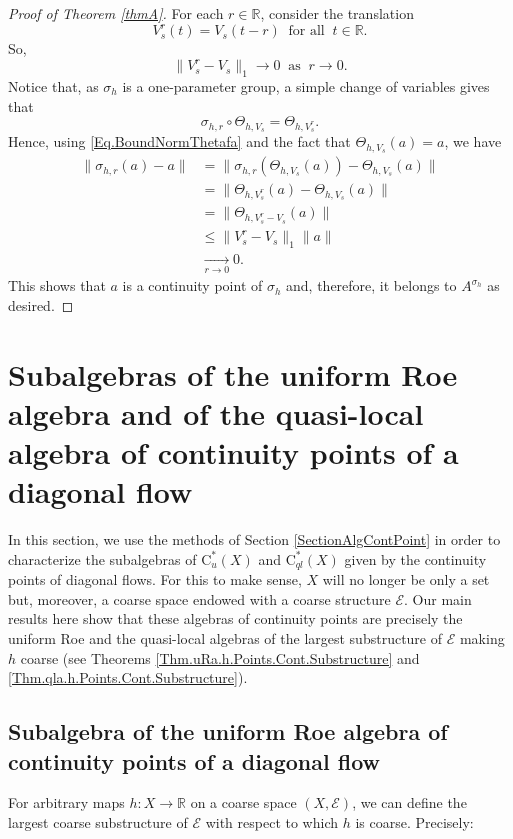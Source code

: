 \documentclass[11pt]{amsart}
\newcommand{\R}{\mathbb{R}}
\newcommand{\cE}{\mathcal{E}}
\newcommand{\cstu}{\mathrm{C}^*_u}
\newcommand{\cstql}{\mathrm{C}^*_{\textit{ql}}}
\numberwithin{equation}{section}
\theoremstyle{definition}
\theoremstyle{remark}
\begin{document}
\begin{proof}  [Proof of Theorem \ref{thmA}]
For each $r\in \R$, consider the translation
\[V^r_s(t)=V_s(t-r)\ \text{ for all }\ t\in \R.\]
So,
\[\|V_s^r-V_s\|_1\to 0\ \text{ as } \ r\to 0.\]
Notice that, as $\sigma_{h}$ is a one-parameter group, a simple change of variables gives that
\[\sigma_{h,r}\circ \Theta_{h,V_s}=\Theta_{h,V_s^r}.\]
Hence, using  \eqref{Eq.BoundNormThetafa} and the fact that  $\Theta_{h,V_s}(a)=a$, we have
\begin{align*}
\|\sigma_{h,r}(a)-a\| &=\|\sigma_{h,r}(\Theta_{h,V_s}(a))-\Theta_{h,V_s}(a)\|\\
&=\|\Theta_{h,V_s^r}(a)-\Theta_{h,V_s}(a)\|\\
&=\|\Theta_{h,V_s^r-V_s}(a)\|\\
&\leq\|{V_s^r}-{V_s}\|_1\|a\|
\\
&\underset{r\to 0}{\longrightarrow} 0.
\end{align*}
This shows that   $a$ is a continuity point of $\sigma_h$ and, therefore, it belongs to  $A^{\sigma_h}$ as desired.
\end{proof}
















\section{Subalgebras of the uniform Roe  algebra and   of the quasi-local  algebra of continuity points of a diagonal flow}\label{SectionSubalgebrasofURAQLContPOint}


In this section,  we use the methods of Section \ref{SectionAlgContPoint} in order to characterize the subalgebras of  $\cstu(X)$ and $\cstql(X)$ given by the continuity points of diagonal flows. For this to make sense, $X$ will no longer be only a set but, moreover, a coarse space endowed with a coarse structure $\cE$. Our main results here show that  these algebras of continuity points are precisely the uniform Roe and the quasi-local algebras of the largest substructure of $\cE$ making $h$  coarse (see Theorems \ref{Thm.uRa.h.Points.Cont.Substructure} and \ref{Thm.qla.h.Points.Cont.Substructure}).


\subsection{Subalgebra of the uniform Roe algebra  of continuity points of a diagonal flow} For arbitrary maps $h\colon X\to \R$ on a coarse space $(X,\cE)$, we can define the largest coarse substructure of $\cE$ with respect to which $h$ is coarse. Precisely:
\end{document}
